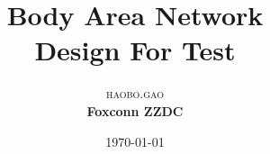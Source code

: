 \documentclass [a4paper,10pt,oneside] {article}
\begin{document}
\title{\textbf{Body Area Network }\\ %
 Design For Test}  %

\author{\textsc{haobo.gao} %
\\{\textbf{Foxconn ZZDC}}} %

\date{\today} %
\maketitle

\tableofcontents
{}



\end{document}
